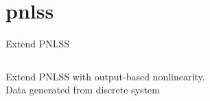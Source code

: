 \documentclass[9pt]{beamer}
\begin{document}
\section{pnlss}
\label{sec:generate-data}


\begin{frame}{Extend PNLSS}
 \begin{columns}
    \begin{column}{0.5\textwidth}
      Extend PNLSS with output-based nonlinearity.\\
      Data generated from discrete
      system\\


\end{column}
\end{columns}
\end{frame}
\end{document}
